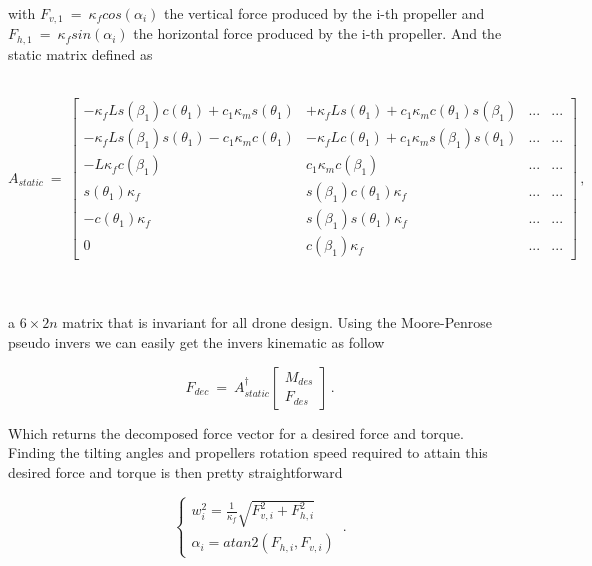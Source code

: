 with $F_{v,1}\ = \ \kappa_f cos(\alpha_i)$ the vertical force produced by the i-th
propeller and $F_{h,1}\ = \ \kappa_f sin(\alpha_i)$ the horizontal force produced
by the i-th propeller. And the static matrix defined as\\\\
\centerline{\begingroup
    \fontsize{9pt}{11pt}\selectfont
$A_{static} \ = \
\begin{bmatrix}
      -\kappa_f L s(\beta_1) c(\theta_1) +c_1\kappa_m s(\theta_1)  &
      + \kappa_f L s(\theta_1) +c_1 \kappa_m c(\theta_1) s(\beta_1)  & ... & ...\\
      -\kappa_f L s(\beta_1) s(\theta_1) - c_1 \kappa_m c(\theta_1) &
      -\kappa_f L c(\theta_1) +c_1 \kappa_m s(\beta_1) s(\theta_1)  & ... & ...\\
      -L \kappa_f c(\beta_1) & c_1 \kappa_m c(\beta_1)  & ... & ...\\
      s(\theta_1) \kappa_f & s(\beta_1) c(\theta_1) \kappa_f & ... & ...\\
      -c(\theta_1) \kappa_f  & s(\beta_1) s(\theta_1) \kappa_f & ... & ...\\
      0 & c(\beta_1) \kappa_f  & ... & ...
\end{bmatrix}\, ,$
\endgroup}\\\\
a $6 \times 2n$ matrix that is invariant for all drone design. Using the Moore-Penrose
pseudo invers we can easily get the invers kinematic as follow

\begin{equation}
  \label{inverse_kin}
  F_{dec}  \ = \ A_{static}^{\dagger}
    \begin{bmatrix}
      M_{des} \\
      F_{des}
    \end{bmatrix}
    \, .
\end{equation}

Which returns the decomposed force vector for a desired force and torque. Finding
the tilting angles and propellers rotation speed required to attain this desired
force and torque is then pretty straightforward

\begin{equation}
  \label{decomposition}
  \begin{cases}
    w_i^2 = \frac{1}{\kappa_f} \sqrt{F_{v,i}^2 + F_{h,i}^2} \\
    \alpha_i = atan2(F_{h,i},F_{v,i})
  \end{cases}\, .
\end{equation}

